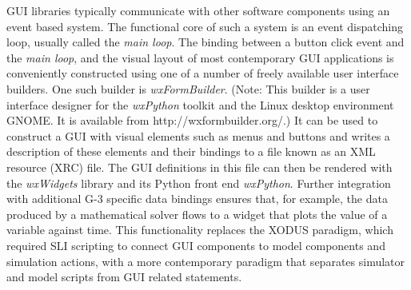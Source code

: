 \documentclass[10pt]{article}
\begin{document}
GUI libraries typically communicate with other software components
using an event based system.  The functional core of such a system is an
event dispatching loop, usually called the {\it main loop}.
The binding between a button click event and the {\it main loop}, and
the visual layout of most contemporary GUI applications is
conveniently constructed using one of a number of freely available user
interface builders.
%
%
One such builder is {\it wxFormBuilder}.  (Note: This builder is a user interface designer for the {\it
    wxPython} toolkit and the Linux desktop environment GNOME. It is
  available from http://wxformbuilder.org/.) It can be used to construct a GUI with visual elements
such as menus and buttons and writes a description of these elements and
their bindings to a file known as an XML resource (XRC) file. The GUI
definitions in this file can then be rendered with the {\it wxWidgets} library and its Python front end {\it
  wxPython}.  Further integration with additional G-3 specific data
bindings ensures that, for example, the data produced by a
mathematical solver flows to a widget that plots the value of a
variable against time.  This functionality replaces the
XODUS paradigm, which required SLI scripting to connect GUI components
to model components and simulation actions, with a more contemporary
paradigm that separates simulator and model scripts from GUI related
statements.
\end{document}
